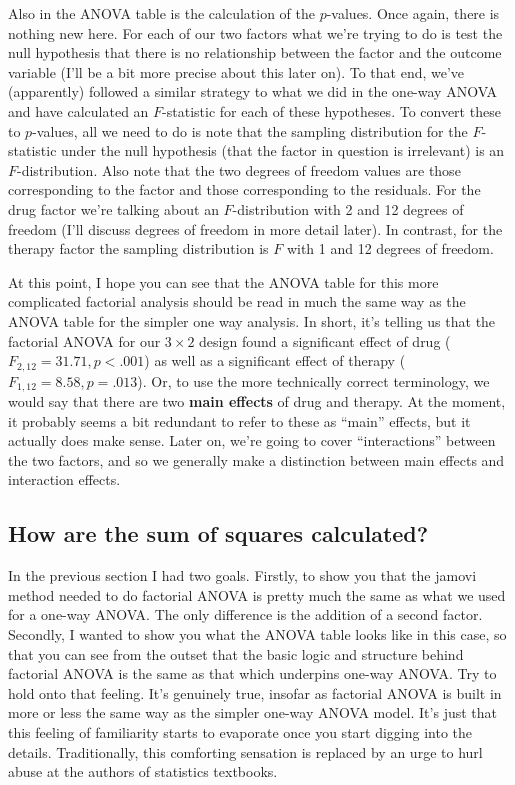 \documentclass[
  a4paper,
]{book}
\begin{document}
Also in the ANOVA table is the calculation of the \(p\)-values. Once
again, there is nothing new here. For each of our two factors what we're
trying to do is test the null hypothesis that there is no relationship
between the factor and the outcome variable (I'll be a bit more precise
about this later on). To that end, we've (apparently) followed a similar
strategy to what we did in the one-way ANOVA and have calculated an
\(F\)-statistic for each of these hypotheses. To convert these to
\(p\)-values, all we need to do is note that the sampling distribution
for the \(F\)-statistic under the null hypothesis (that the factor in
question is irrelevant) is an \(F\)-distribution. Also note that the two
degrees of freedom values are those corresponding to the factor and
those corresponding to the residuals. For the drug factor we're talking
about an \(F\)-distribution with 2 and 12 degrees of freedom (I'll
discuss degrees of freedom in more detail later). In contrast, for the
therapy factor the sampling distribution is \(F\) with 1 and 12 degrees
of freedom.

At this point, I hope you can see that the ANOVA table for this more
complicated factorial analysis should be read in much the same way as
the ANOVA table for the simpler one way analysis. In short, it's telling
us that the factorial ANOVA for our \(3 \times 2\) design found a
significant effect of drug (\(F_{2,12} = 31.71, p < .001\)) as well as a
significant effect of therapy (\(F_{1,12} = 8.58, p = .013\)). Or, to
use the more technically correct terminology, we would say that there
are two \textbf{main effects} of drug and therapy. At the moment, it
probably seems a bit redundant to refer to these as ``main'' effects,
but it actually does make sense. Later on, we're going to cover
``interactions'' between the two factors, and so we generally make a
distinction between main effects and interaction effects.

\hypertarget{how-are-the-sum-of-squares-calculated}{%
\subsection{How are the sum of squares
calculated?}\label{how-are-the-sum-of-squares-calculated}}

In the previous section I had two goals. Firstly, to show you that the
jamovi method needed to do factorial ANOVA is pretty much the same as
what we used for a one-way ANOVA. The only difference is the addition of
a second factor. Secondly, I wanted to show you what the ANOVA table
looks like in this case, so that you can see from the outset that the
basic logic and structure behind factorial ANOVA is the same as that
which underpins one-way ANOVA. Try to hold onto that feeling. It's
genuinely true, insofar as factorial ANOVA is built in more or less the
same way as the simpler one-way ANOVA model. It's just that this feeling
of familiarity starts to evaporate once you start digging into the
details. Traditionally, this comforting sensation is replaced by an urge
to hurl abuse at the authors of statistics textbooks.
\end{document}
